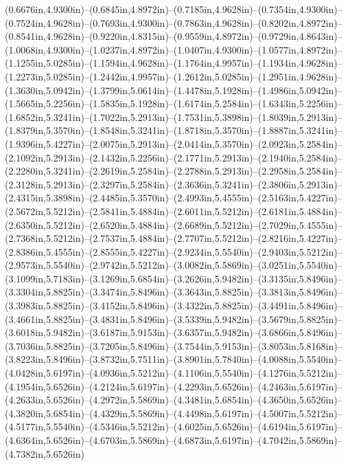 (0.6676in,4.9300in)--(0.6845in,4.8972in)--(0.7185in,4.9628in)--(0.7354in,4.9300in)--(0.7524in,4.9628in)--(0.7693in,4.9300in)--(0.7863in,4.9628in)--(0.8202in,4.8972in)--(0.8541in,4.9628in)--(0.9220in,4.8315in)--(0.9559in,4.8972in)--(0.9729in,4.8643in)--(1.0068in,4.9300in)--(1.0237in,4.8972in)--(1.0407in,4.9300in)--(1.0577in,4.8972in)--(1.1255in,5.0285in)--(1.1594in,4.9628in)--(1.1764in,4.9957in)--(1.1934in,4.9628in)--(1.2273in,5.0285in)--(1.2442in,4.9957in)--(1.2612in,5.0285in)--(1.2951in,4.9628in)--(1.3630in,5.0942in)--(1.3799in,5.0614in)--(1.4478in,5.1928in)--(1.4986in,5.0942in)--(1.5665in,5.2256in)--(1.5835in,5.1928in)--(1.6174in,5.2584in)--(1.6343in,5.2256in)--(1.6852in,5.3241in)--(1.7022in,5.2913in)--(1.7531in,5.3898in)--(1.8039in,5.2913in)--(1.8379in,5.3570in)--(1.8548in,5.3241in)--(1.8718in,5.3570in)--(1.8887in,5.3241in)--(1.9396in,5.4227in)--(2.0075in,5.2913in)--(2.0414in,5.3570in)--(2.0923in,5.2584in)--(2.1092in,5.2913in)--(2.1432in,5.2256in)--(2.1771in,5.2913in)--(2.1940in,5.2584in)--(2.2280in,5.3241in)--(2.2619in,5.2584in)--(2.2788in,5.2913in)--(2.2958in,5.2584in)--(2.3128in,5.2913in)--(2.3297in,5.2584in)--(2.3636in,5.3241in)--(2.3806in,5.2913in)--(2.4315in,5.3898in)--(2.4485in,5.3570in)--(2.4993in,5.4555in)--(2.5163in,5.4227in)--(2.5672in,5.5212in)--(2.5841in,5.4884in)--(2.6011in,5.5212in)--(2.6181in,5.4884in)--(2.6350in,5.5212in)--(2.6520in,5.4884in)--(2.6689in,5.5212in)--(2.7029in,5.4555in)--(2.7368in,5.5212in)--(2.7537in,5.4884in)--(2.7707in,5.5212in)--(2.8216in,5.4227in)--(2.8386in,5.4555in)--(2.8555in,5.4227in)--(2.9234in,5.5540in)--(2.9403in,5.5212in)--(2.9573in,5.5540in)--(2.9742in,5.5212in)--(3.0082in,5.5869in)--(3.0251in,5.5540in)--(3.1099in,5.7183in)--(3.1269in,5.6854in)--(3.2626in,5.9482in)--(3.3135in,5.8496in)--(3.3304in,5.8825in)--(3.3474in,5.8496in)--(3.3643in,5.8825in)--(3.3813in,5.8496in)--(3.3983in,5.8825in)--(3.4152in,5.8496in)--(3.4322in,5.8825in)--(3.4491in,5.8496in)--(3.4661in,5.8825in)--(3.4831in,5.8496in)--(3.5339in,5.9482in)--(3.5679in,5.8825in)--(3.6018in,5.9482in)--(3.6187in,5.9153in)--(3.6357in,5.9482in)--(3.6866in,5.8496in)--(3.7036in,5.8825in)--(3.7205in,5.8496in)--(3.7544in,5.9153in)--(3.8053in,5.8168in)--(3.8223in,5.8496in)--(3.8732in,5.7511in)--(3.8901in,5.7840in)--(4.0088in,5.5540in)--(4.0428in,5.6197in)--(4.0936in,5.5212in)--(4.1106in,5.5540in)--(4.1276in,5.5212in)--(4.1954in,5.6526in)--(4.2124in,5.6197in)--(4.2293in,5.6526in)--(4.2463in,5.6197in)--(4.2633in,5.6526in)--(4.2972in,5.5869in)--(4.3481in,5.6854in)--(4.3650in,5.6526in)--(4.3820in,5.6854in)--(4.4329in,5.5869in)--(4.4498in,5.6197in)--(4.5007in,5.5212in)--(4.5177in,5.5540in)--(4.5346in,5.5212in)--(4.6025in,5.6526in)--(4.6194in,5.6197in)--(4.6364in,5.6526in)--(4.6703in,5.5869in)--(4.6873in,5.6197in)--(4.7042in,5.5869in)--(4.7382in,5.6526in) 